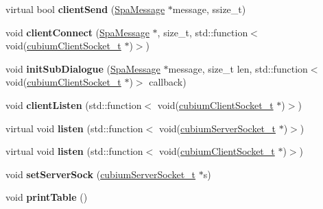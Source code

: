 \begin{DoxyCompactItemize}
virtual bool {\bfseries client\+Send} (\hyperlink{structSpaMessage}{Spa\+Message} $\ast$message, ssize\+\_\+t)
\item 
\mbox{\label{classLocalCommunicator_a4dc9ea76a7d6d1d363ec8b69c1d5d586}} 
void {\bfseries client\+Connect} (\hyperlink{structSpaMessage}{Spa\+Message} $\ast$, size\+\_\+t, std\+::function$<$ void(\hyperlink{structcubiumClientSocket__t}{cubium\+Client\+Socket\+\_\+t} $\ast$)$>$)
\item 
\mbox{\label{classLocalCommunicator_a8ed10b0a1f9be12597a2e095b7b8fb3e}} 
void {\bfseries init\+Sub\+Dialogue} (\hyperlink{structSpaMessage}{Spa\+Message} $\ast$message, size\+\_\+t len, std\+::function$<$ void(\hyperlink{structcubiumClientSocket__t}{cubium\+Client\+Socket\+\_\+t} $\ast$)$>$ callback)
\item 
\mbox{\label{classLocalCommunicator_a03deedab1d3f79fe328a21aa2d5c6bfb}} 
void {\bfseries client\+Listen} (std\+::function$<$ void(\hyperlink{structcubiumClientSocket__t}{cubium\+Client\+Socket\+\_\+t} $\ast$)$>$)
\item 
\mbox{\label{classLocalCommunicator_a320a09f88a1eb840e517753b603cd08b}} 
virtual void {\bfseries listen} (std\+::function$<$ void(\hyperlink{structcubiumServerSocket__t}{cubium\+Server\+Socket\+\_\+t} $\ast$)$>$)
\item 
\mbox{\label{classLocalCommunicator_a33c7148ee35ec38773b7b4c8f32c643c}} 
virtual void {\bfseries listen} (std\+::function$<$ void(\hyperlink{structcubiumClientSocket__t}{cubium\+Client\+Socket\+\_\+t} $\ast$)$>$)
\item 
\mbox{\label{classLocalCommunicator_a3321b932c8c555587b8b3200bc4dfcdb}} 
void {\bfseries set\+Server\+Sock} (\hyperlink{structcubiumServerSocket__t}{cubium\+Server\+Socket\+\_\+t} $\ast$s)
\item 
\mbox{\label{classLocalCommunicator_a96569a4dc0b07439ab880385428a53f7}} 
void {\bfseries print\+Table} ()
\end{DoxyCompactItemize}
